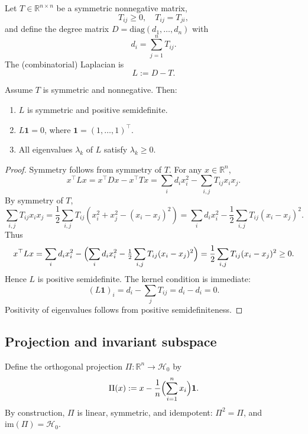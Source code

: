 \documentclass[11pt]{article}
\begin{document}
Let \(T\in\mathbb{R}^{n\times n}\) be a symmetric nonnegative matrix,
\[
T_{ij} \ge 0,\quad T_{ij} = T_{ji},
\]
and define the degree matrix \(D = \mathrm{diag}(d_1,\dots,d_n)\) with
\[
d_i = \sum_{j=1}^n T_{ij}.
\]
The (combinatorial) Laplacian is
\begin{equation}
L := D - T.
\label{eq:laplacian-def}
\end{equation}

\begin{lemma}
\label{lem:laplacian-basics}
Assume \(T\) is symmetric and nonnegative. Then:
\begin{enumerate}
  \item \(L\) is symmetric and positive semidefinite.
  \item \(L\mathbf{1} = 0\), where \(\mathbf{1} = (1,\dots,1)^\top\).
  \item All eigenvalues \(\lambda_k\) of \(L\) satisfy \(\lambda_k \ge 0\).
\end{enumerate}
\end{lemma}

\begin{proof}
Symmetry follows from symmetry of \(T\). For any \(x\in\mathbb{R}^n\),
\[
x^\top L x = x^\top D x - x^\top T x
  = \sum_{i} d_i x_i^2 - \sum_{i,j} T_{ij} x_i x_j.
\]
By symmetry of \(T\),
\[
\sum_{i,j} T_{ij} x_i x_j
  = \frac{1}{2}\sum_{i,j} T_{ij}(x_i^2 + x_j^2 - (x_i - x_j)^2)
  = \sum_i d_i x_i^2 - \frac{1}{2}\sum_{i,j} T_{ij}(x_i - x_j)^2.
\]
Thus
\[
x^\top L x
  = \sum_i d_i x_i^2 - \Bigl(\sum_i d_i x_i^2 - \tfrac{1}{2}\sum_{i,j} T_{ij}(x_i - x_j)^2\Bigr)
  = \frac{1}{2}\sum_{i,j} T_{ij}(x_i - x_j)^2 \ge 0.
\]
Hence \(L\) is positive semidefinite. The kernel condition is immediate:
\[
(L\mathbf{1})_i = d_i - \sum_j T_{ij} = d_i - d_i = 0.
\]
Positivity of eigenvalues follows from positive semidefiniteness.
\end{proof}

\subsection{Projection and invariant subspace}

Define the orthogonal projection \(\Pi:\mathbb{R}^n\to\mathcal{H}_0\) by
\begin{equation}
\Pi(x) := x - \frac{1}{n}\Bigl(\sum_{i=1}^n x_i\Bigr)\mathbf{1}.
\label{eq:projection-def}
\end{equation}
By construction, \(\Pi\) is linear, symmetric, and idempotent:
\(\Pi^2 = \Pi\), and \(\mathrm{im}(\Pi) = \mathcal{H}_0\).
\end{document}
